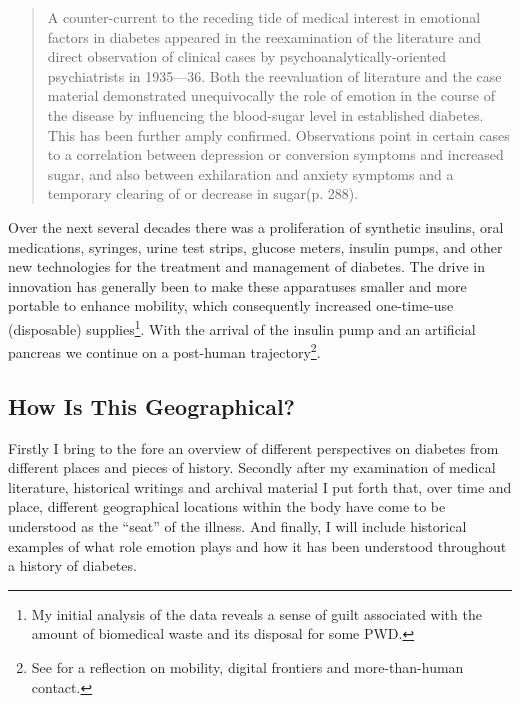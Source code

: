 \documentclass[12pt]{article}
\begin{document}
\begin{singlespace}
  \begin{quote} 
	A counter-current to the receding tide of medical interest in emotional factors in diabetes appeared in the reexamination of the literature and direct observation of clinical cases by psychoanalytically-oriented psychiatrists in 1935—36. Both the reevaluation of literature and the case material demonstrated unequivocally the role of emotion in the course of the disease by influencing the blood-sugar level in established diabetes. This has been further amply confirmed. Observations point in certain cases to a correlation between depression or conversion symptoms and increased sugar, and also between exhilaration and anxiety symptoms and a temporary clearing of or decrease in sugar(p. 288).
  \end{quote} 
\end{singlespace}

Over the next several decades there was a proliferation of synthetic insulins, oral medications, syringes, urine test strips, glucose meters, insulin pumps, and other new technologies \citep{phillip_attd_2012} for the treatment and management of diabetes. The drive in innovation has generally been to make these apparatuses smaller and more portable to enhance mobility, which consequently increased one-time-use (disposable) supplies\footnote{My initial analysis of the data reveals a sense of guilt associated with the amount of biomedical waste and its disposal for some PWD.}. With the arrival of the insulin pump and an artificial pancreas we continue on a post-human trajectory\footnote{See \citet{wilson_more_2011} for a reflection on mobility, digital frontiers and more-than-human contact.}.  

\subsection{How Is This Geographical?}
Firstly I bring to the fore an overview of different perspectives on diabetes from different places and pieces of history. Secondly after my examination of medical literature, historical writings and archival material I put forth that, over time and place, different geographical locations within the body have come to be understood as the ``seat'' of the illness. And finally, I will include historical examples of what role emotion plays and how it has been understood throughout a history of diabetes. 
\end{document}
